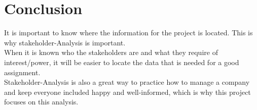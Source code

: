 \section{Conclusion}

It is important to know where the information for the project is located. This is why stakeholder-Analysis is important.\\
When it is known who the stakeholders are and what they require of interest/power, it will be easier to locate the data that is needed for a good assignment.\\
Stakeholder-Analysis is also a great way to practice how to manage a company and keep everyone included happy and well-informed, which is why this project focuses on this analysis.

